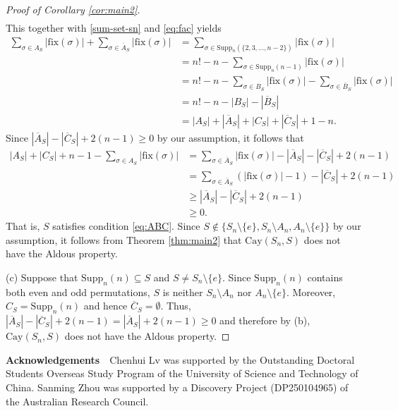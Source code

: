 \documentclass[12pt, a4paper]{article}
\def\fix{\mathrm{fix}}
\theoremstyle{definition}
\begin{document}
\begin{proof}[Proof of Corollary \ref{cor:main2}]
\begin{align*}
\end{align*}
This together with \eqref{sum-set-sn} and \eqref{eq:fac} yields
\begin{align}
\sum_{\sigma \in A_S} |\fix(\sigma)| + \sum_{\sigma \in \overline{A}_S} |\fix(\sigma)|
&= \sum_{\sigma \in \mathrm{Supp}_n(\{2, 3, \ldots, n-2\})} |\fix(\sigma)| \nonumber \\
&= n! - n - \sum_{\sigma \in \mathrm{Supp}_n(n-1)} |\fix(\sigma)| \label{eq:fac1} \\
&= n! - n - \sum_{\sigma \in B_S} |\fix(\sigma)| - \sum_{\sigma \in \overline{B}_S} |\fix(\sigma)| \nonumber \\ 
&= n! - n - |B_S| - |\overline{B}_S| \nonumber \\ 
&= |A_S| + |\overline{A}_S| + |C_S| + |\overline{C}_S| + 1 - n. \nonumber 
\end{align}
Since $|\overline{A}_S|-|\overline{C}_S|+2(n-1) \ge 0$ by our assumption, it follows that
\begin{align*}
|A_S| + |C_S| + n - 1 - \sum_{\sigma \in A_S} |\fix(\sigma)| 
&= \sum_{\sigma \in \overline{A}_S} |\fix(\sigma)|-|\overline{A}_S|-|\overline{C}_S|+2(n-1) \\
&= \sum_{\sigma \in \overline{A}_S} (|\fix(\sigma)|-1)-|\overline{C}_S|+2(n-1) \\
& \geq |\overline{A}_S|-|\overline{C}_S|+2(n-1) \\
& \geq 0.
\end{align*}
That is, $S$ satisfies condition \eqref{eq:ABC}. Since $S \notin \{S_n\setminus\{e\}, S_n\setminus A_n, A_n\setminus\{e\}\}$ by our assumption, it follows from Theorem \ref{thm:main2} that $\mathrm{Cay}(S_n,S)$ does not have the Aldous property.

(c) Suppose that $\mathrm{Supp}_n(n)\subseteq S$ and $S \neq S_n\setminus\{e\}$. Since $\mathrm{Supp}_n(n)$ contains both even and odd permutations, $S$ is neither $S_n\setminus A_n$ nor $A_n\setminus\{e\}$. 
Moreover, $C_S = \mathrm{Supp}_n(n)$ and hence $\overline{C}_S = \emptyset$. Thus, $|\overline{A}_S|-|\overline{C}_S|+2(n-1) = |\overline{A}_S|+2(n-1) \ge 0$ and therefore by (b), $\mathrm{Cay}(S_n,S)$ does not have the Aldous property. 
\end{proof}



 
\medskip
\noindent \textbf{Acknowledgements}~~Chenhui Lv was supported by the Outstanding Doctoral Students Overseas Study Program of the University of Science and Technology of China. Sanming Zhou was supported by a Discovery Project (DP250104965) of the Australian Research Council.
\end{document}
